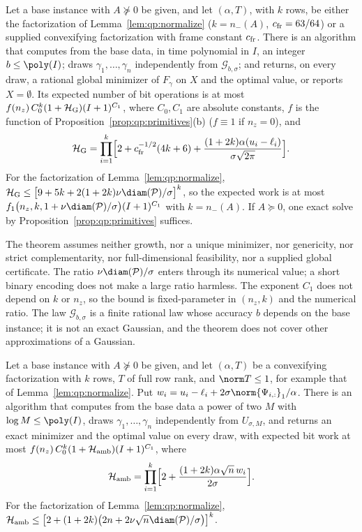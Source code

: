\begin{theorem}\label{thm:qp:gauss}
Let a base instance with $A\not\succeq0$ be given, and let $(\alpha,T)$, with
$k$ rows, be either the factorization of Lemma~\ref{lem:qp:normalize}
($k=n_-(A)$, $c_{\rm fr}=63/64$) or a supplied convexifying factorization with
frame constant $c_{\rm fr}$. There
is an algorithm that computes from the base data, in time polynomial in $I$,
an integer $b\le\poly(I)$; draws $\gamma_1,\dots,\gamma_n$ independently from
$\mathcal G_{b,\sigma}$; and returns, on every draw, a rational global
minimizer of $F_\gamma$ on $X$ and the optimal value, or reports $X=\emptyset$.
Its expected number of bit operations is at most
$f(n_z)\,C_0^k(1+\mathcal H_{\rm G})(I+1)^{C_1}$, where $C_0,C_1$ are absolute
constants, $f$ is the function of Proposition~\ref{prop:qp:primitives}(b)
($f\equiv1$ if $n_z=0$), and
\[
 \mathcal H_{\rm G}=\prod_{i=1}^k\Bigl[2+c_{\rm fr}^{-1/2}(4k+6)
 +\frac{(1+2k)\alpha(u_i-\ell_i)}{\sigma\sqrt{2\pi}}\Bigr].
\]
For the factorization of Lemma~\ref{lem:qp:normalize},
$\mathcal H_{\rm G}\le\bigl[9+5k+2(1+2k)\nu\diam(\mathcal P)/\sigma\bigr]^k$,
so the expected work is at most
$f_1\bigl(n_z,k,1+\nu\diam(\mathcal P)/\sigma\bigr)(I+1)^{C_1}$ with
$k=n_-(A)$. If $A\succeq0$, one exact solve by
Proposition~\ref{prop:qp:primitives} suffices.
\end{theorem}

The theorem assumes neither growth, nor a unique minimizer, nor genericity,
nor strict complementarity, nor full-dimensional feasibility, nor a supplied
global certificate. The ratio $\nu\diam(\mathcal P)/\sigma$ enters through its
numerical value; a short binary encoding does not make a large ratio
harmless. The exponent $C_1$ does not depend on $k$ or $n_z$, so the bound is
fixed-parameter in $(n_z,k)$ and the numerical ratio. The law
$\mathcal G_{b,\sigma}$ is a finite rational law whose accuracy $b$ depends on
the base instance; it is not an exact Gaussian, and the theorem does not
cover other approximations of a Gaussian.

\begin{theorem}\label{thm:qp:uniform}
Let a base instance with $A\not\succeq0$ be given, and let $(\alpha,T)$ be a
convexifying factorization with $k$ rows, $T$ of full row rank, and
$\norm T\le1$, for example that of Lemma~\ref{lem:qp:normalize}. Put
$w_i=u_i-\ell_i+2\sigma\norm{\Psi_{i,:}}_1/\alpha$. There is an algorithm that
computes from the base data a power of two $M$ with $\log M\le\poly(I)$, draws
$\gamma_1,\dots,\gamma_n$ independently from $U_{\sigma,M}$, and
returns an exact minimizer and the optimal value on every draw, with expected
bit work at most $f(n_z)\,C_0^k(1+\mathcal H_{\rm amb})(I+1)^{C_1}$, where
\[
 \mathcal H_{\rm amb}=\prod_{i=1}^k\Bigl[2+\frac{(1+2k)\alpha\sqrt n\,w_i}{2\sigma}\Bigr].
\]
For the factorization of Lemma~\ref{lem:qp:normalize},
$\mathcal H_{\rm amb}\le\bigl[2+(1+2k)\bigl(2n+2\nu\sqrt n\diam(\mathcal P)/\sigma\bigr)\bigr]^k$.
\end{theorem}


